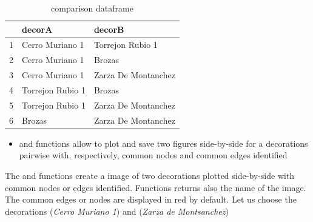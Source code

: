 \documentclass[article]{jss}\usepackage[]{graphicx}\usepackage[]{color}
\begin{document}
\begin{table}[ht]
\centering
\begin{tabular}{rll}
  \hline
 & decorA & decorB \\ 
  \hline
1 & Cerro Muriano 1 & Torrejon Rubio 1 \\ 
  2 & Cerro Muriano 1 & Brozas \\ 
  3 & Cerro Muriano 1 & Zarza De Montanchez \\ 
  4 & Torrejon Rubio 1 & Brozas \\ 
  5 & Torrejon Rubio 1 & Zarza De Montanchez \\ 
  6 & Brozas & Zarza De Montanchez \\ 
   \hline
\end{tabular}
\caption{comparison dataframe} 
\label{Test_table_1}
\end{table}



\begin{itemize}  
  \item {} and  functions allow to plot and save two figures side-by-side for a decorations pairwise with, respectively, common nodes and common edges identified
\end{itemize}

The and  functions create a  image of two decorations plotted side-by-side with common nodes or edges identified. Functions returns also the name of the image. The common edges or nodes are displayed in red by default. Let us choose the decorations  (\emph{Cerro Muriano 1}) and  (\emph{Zarza de Montsanchez})
\end{document}
